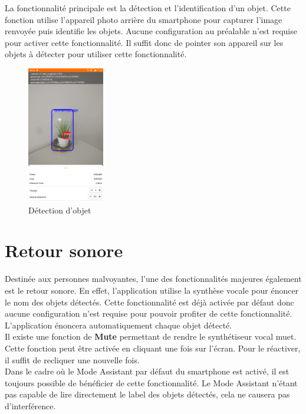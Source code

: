 \documentclass[UTF8]{EPURapport}
\begin{document}
La fonctionnalité principale est la détection et l'identification d'un objet. Cette fonction utilise l'appareil photo arrière du smartphone pour capturer l'image renvoyée puis identifie les objets. Aucune configuration au préalable n'est requise pour activer cette fonctionnalité. Il suffit donc de pointer son appareil sur les objets à détecter pour utiliser cette fonctionnalité.

\begin{figure}[h!]
\centering
  \includegraphics[width=0.3\textwidth]{images/result.jpg}
  \caption{Détection d'objet}
  \label{fig:objectdetection}
\end{figure}
\section{Retour sonore}

Destinée aux personnes malvoyantes, l'une des fonctionnalités majeures également est le retour sonore. En effet, l'application utilise la synthèse vocale pour énoncer le nom des objets détectés. Cette fonctionnalité est déjà activée par défaut donc aucune configuration n'est requise pour pouvoir profiter de cette fonctionnalité. L'application énoncera automatiquement chaque objet détecté.\\

Il existe une fonction de \textbf{Mute} permettant de rendre le synthétiseur vocal muet. Cette fonction peut être activée en cliquant une fois sur l'écran. Pour le réactiver, il suffit de recliquer une nouvelle fois.\\

Dans le cadre où le Mode Assistant par défaut du smartphone est activé, il est toujours possible de bénéficier de cette fonctionnalité. Le Mode Assistant n'étant pas capable de lire directement le label des objets détectés, cela ne causera pas d'interférence. \\
\end{document}
